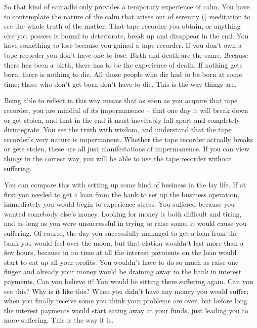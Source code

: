 So that kind of sam\=adhi only provides a temporary experience of calm. You have to contemplate the nature of the calm that arises out of serenity () meditation to see the whole truth of the matter. That tape recorder you obtain, or anything else you possess is bound to deteriorate, break up and disappear in the end. You have something to lose because you gained a tape recorder. If you don't own a tape recorder you don't have one to lose. Birth and death are the same. Because there has been a birth, there has to be the experience of death. If nothing gets born, there is nothing to die. All those people who die had to be born at some time; those who don't get born don't have to die. This is the way things are.

Being able to reflect in this way means that as soon as you acquire that tape recorder, you are mindful of its impermanence -- that one day it will break down or get stolen, and that in the end it must inevitably fall apart and completely disintegrate. You see the truth with wisdom, and understand that the tape recorder's very nature is impermanent. Whether the tape recorder actually breaks or gets stolen, these are all just manifestations of impermanence. If you can view things in the correct way, you will be able to use the tape recorder without suffering. 

You can compare this with setting up some kind of business in the lay life. If at first you needed to get a loan from the bank to set up the business operation, immediately you would begin to experience stress. You suffered because you wanted somebody else's money. Looking for money is both difficult and tiring, and as long as you were unsuccessful in trying to raise some, it would cause you suffering. Of course, the day you successfully managed to get a loan from the bank you would feel over the moon, but that elation wouldn't last more than a few hours, because in no time at all the interest payments on the loan would start to eat up all your profits. You wouldn't have to do so much as raise one finger and already your money would be draining away to the bank in interest payments. Can you believe it! You would be sitting there suffering again. Can you see this? Why is it like this? When you didn't have any money you would suffer; when you finally receive some you think your problems are over, but before long the interest payments would start eating away at your funds, just leading you to more suffering. This is the way it is. 

